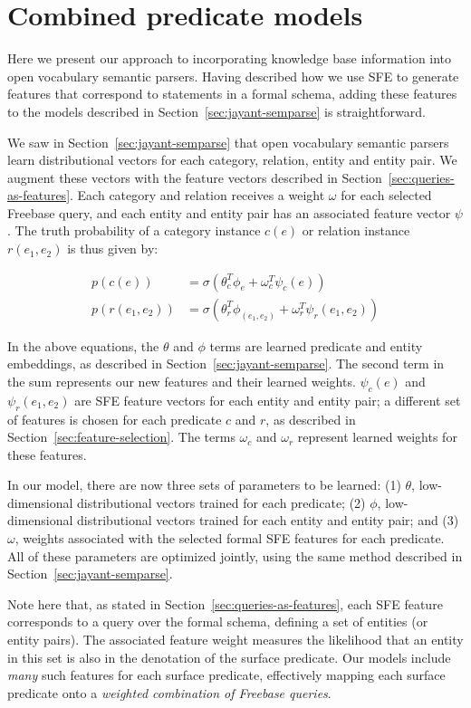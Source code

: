 \documentclass[11pt,letterpaper]{article}
\newcommand{\secref}[1]{Section~\ref{sec:#1}}
\newcommand{\prob}{\ensuremath{p}}
\begin{document}
\section{Combined predicate models}
\label{sec:method}

Here we present our approach to incorporating knowledge base information into
open vocabulary semantic parsers.  Having described how we use SFE to generate
features that correspond to statements in a formal schema, adding these
features to the models described in \secref{jayant-semparse} is
straightforward.

We saw in \secref{jayant-semparse} that open vocabulary semantic parsers learn
distributional vectors for each category, relation, entity and entity pair.  We
augment these vectors with the feature vectors described in
\secref{queries-as-features}.  Each category and relation receives a weight
$\omega$ for each selected Freebase query, and each entity and entity pair has
an associated feature vector $\psi$.  The truth probability of a category
instance $c(e)$ or relation instance $r(e_1, e_2)$ is thus given by:

\begin{align*}
  \prob(c(e)) &= \sigma ( \theta_c^T \phi_e + \omega_c^T \psi_c(e)) \\
  \prob(r(e_1, e_2)) &= \sigma ( \theta_r^T \phi_{(e_1, e_2)} + \omega_r^T \psi_r(e_1, e_2) )
\end{align*}

In the above equations, the $\theta$ and $\phi$ terms are learned predicate and
entity embeddings, as described in \secref{jayant-semparse}. The second term in
the sum represents our new features and their learned weights.  $\psi_c(e)$ and
$\psi_r(e_1, e_2)$ are SFE feature vectors for each entity and entity pair; a
different set of features is chosen for each predicate $c$ and $r$, as
described in \secref{feature-selection}.  The terms $\omega_c$ and $\omega_r$
represent learned weights for these features.

In our model, there are now three sets of parameters to be learned: (1)
$\theta$, low-dimensional distributional vectors trained for each predicate;
(2) $\phi$, low-dimensional distributional vectors trained for each entity and
entity pair; and (3) $\omega$, weights associated with the selected formal SFE
features for each predicate.  All of these parameters are optimized jointly,
using the same method described in \secref{jayant-semparse}.

Note here that, as stated in \secref{queries-as-features}, each SFE feature
corresponds to a query over the formal schema, defining a set of entities (or
entity pairs).  The associated feature weight measures the likelihood that an
entity in this set is also in the denotation of the surface predicate. Our
models include \emph{many} such features for each surface predicate,
effectively mapping each surface predicate onto a \emph{weighted combination of
Freebase queries}.
\end{document}
